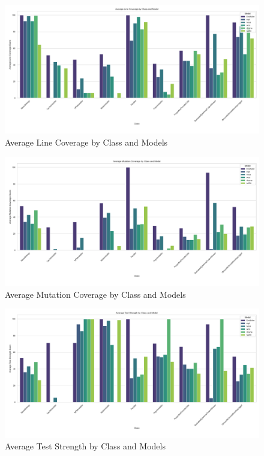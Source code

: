 \begin{figure}[H]
\centering
\includegraphics[width=1\textwidth]{images/line_coverage_avg.png}
\caption{Average Line Coverage by Class and Models}
\label{fig:line_coverage}
\end{figure}

\begin{figure}[H]
\centering
\includegraphics[width=1\textwidth]{images/mutation_coverage_avg.png}
\caption{Average Mutation Coverage by Class and Models}
\label{fig:mutation_coverage}
\end{figure}

\begin{figure}[H]
\centering
\includegraphics[width=1\textwidth]{images/test_strength_avg.png}
\caption{Average Test Strength by Class and Models}
\label{fig:test_strength}
\end{figure}

